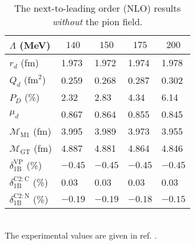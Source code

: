 \documentclass[fleqn,12pt,twoside]{article}
\begin{document}
\begin{table}[htb]
\caption{The next-to-leading order (NLO) results
{\em without} the pion field.}
\label{table:1}
\newcommand{\m}{\hphantom{$-$}}
\newcommand{\cc}[1]{\multicolumn{1}{c}{#1}}
\renewcommand{\tabcolsep}{2pc} %
\renewcommand{\arraystretch}{1.2} %
\begin{tabular}{@{}lllll}
\hline
$\Lambda$ (MeV)           & \cc{$140$} & \cc{$150$} & \cc{$175$} & \cc{$200$} \\
\hline
$r_d$ (fm)                & \m1.973 & \m1.972 & \m1.974 & \m1.978 \\
$Q_d$ ($\mbox{fm}^2$)     & \m0.259 & \m0.268 & \m0.287 & \m0.302 \\
$P_D$ (\%)                & \m2.32  & \m2.83  & \m4.34  & \m6.14  \\
$\mu_d$                   & \m0.867 & \m0.864 & \m0.855 & \m0.845 \\
$\mathcal{M}_{\mathrm{M1}}$ (fm)   & \m3.995 & \m3.989 & \m3.973 & \m3.955 \\
$\mathcal{M}_{\mathrm{GT}}$ (fm)   & \m4.887 & \m4.881 & \m4.864 & \m4.846 \\
$\delta_{\mathrm{1B}}^{\mathrm{VP}}$ (\%)   
                          & $-0.45$ & $-0.45$ & $-0.45$ & $-0.45$ \\
$\delta_{\mathrm{1B}}^{\mathrm{C2:C}}$ (\%) 
                          & \m0.03  & \m0.03  & \m0.03  & \m0.03  \\
$\delta_{\mathrm{1B}}^{\mathrm{C2:N}}$ (\%) 
                          & $-0.19$ & $-0.19$ & $-0.18$ & $-0.15$ \\
\hline
\end{tabular}\\[2pt]
The experimental values are given in ref. \cite{Eato75}.
\end{table}
\end{document}
